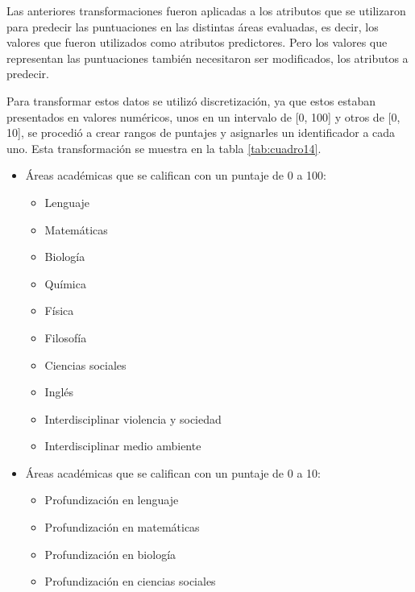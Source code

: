Las anteriores transformaciones fueron aplicadas a los atributos que se utilizaron para predecir las puntuaciones en las distintas áreas evaluadas, es decir, los valores que fueron utilizados como atributos predictores. Pero los valores que representan las puntuaciones también necesitaron ser modificados, los atributos a predecir.

Para transformar estos datos se utilizó discretización, ya que estos estaban presentados en valores numéricos, unos en un intervalo de [0, 100] y otros de [0, 10], se procedió a crear rangos de puntajes y asignarles un identificador a cada uno. Esta transformación se muestra en la tabla \ref{tab:cuadro14}.
\begin{itemize}
\item Áreas académicas que se califican con un puntaje de 0 a 100:
\begin{itemize}
\item Lenguaje 
\item Matemáticas 
\item Biología 
\item Química 
\item Física 
\item Filosofía 
\item Ciencias sociales 
\item Inglés  
\item Interdisciplinar violencia y sociedad 
\item Interdisciplinar medio ambiente
\end{itemize}
\item Áreas académicas que se califican con un puntaje de 0 a 10:
\begin{itemize}
\item Profundización en lenguaje 
\item Profundización en matemáticas 
\item Profundización en biología 
\item Profundización en ciencias sociales
\end{itemize}
\end{itemize}

